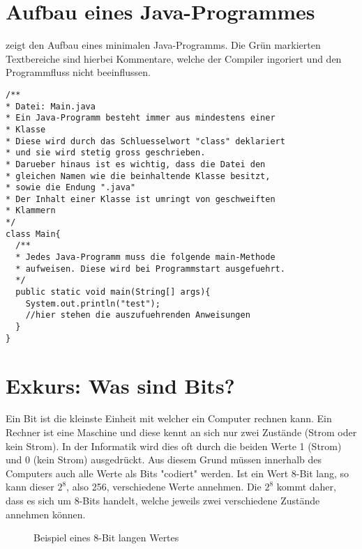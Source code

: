 \documentclass[12pt,a4paper]{../summary}
\begin{document}
\section{Aufbau eines Java-Programmes}
 zeigt den Aufbau eines minimalen Java-Programms. Die Grün markierten Textbereiche sind hierbei Kommentare, welche der Compiler ingoriert und den Programmfluss nicht beeinflussen.
\begin{lstlisting}[captionpos=b,caption={Beispiel eines Java-Programms},label={main_one}]
/**
* Datei: Main.java
* Ein Java-Programm besteht immer aus mindestens einer
* Klasse
* Diese wird durch das Schluesselwort "class" deklariert
* und sie wird stetig gross geschrieben.
* Darueber hinaus ist es wichtig, dass die Datei den
* gleichen Namen wie die beinhaltende Klasse besitzt,
* sowie die Endung ".java"
* Der Inhalt einer Klasse ist umringt von geschweiften
* Klammern
*/ 
class Main{
  /**
  * Jedes Java-Programm muss die folgende main-Methode
  * aufweisen. Diese wird bei Programmstart ausgefuehrt.
  */
  public static void main(String[] args){
  	System.out.println("test");
  	//hier stehen die auszufuehrenden Anweisungen
  }
}
\end{lstlisting}
\section{Exkurs: Was sind Bits?}
Ein Bit ist die kleinste Einheit mit welcher ein Computer rechnen kann.
Ein Rechner ist eine Maschine und diese kennt an sich nur zwei Zustände (Strom oder kein Strom). In der Informatik wird dies oft durch die beiden Werte 1 (Strom) und 0 (kein Strom) ausgedrückt. Aus diesem Grund müssen innerhalb des Computers auch alle Werte als Bits "codiert" werden.
Ist ein Wert 8-Bit lang, so kann dieser $2^8$, also 256, verschiedene Werte annehmen.
Die $2^8$ kommt daher, dass es sich um 8-Bits handelt, welche jeweils zwei verschiedene Zustände annehmen können.
\begin{figure}[H]
\begin{center}
\end{center}
\caption{Beispiel eines 8-Bit langen Wertes}
\end{figure}
\end{document}
